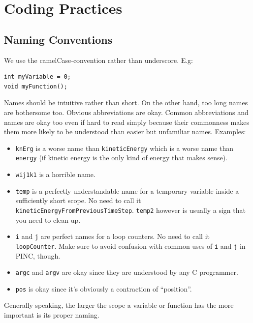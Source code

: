 \documentclass[10pt,a4paper]{article}
\begin{document}
\section{Coding Practices}

\subsection{Naming Conventions}
We use the camelCase-convention rather than underscore. E.g:
\begin{lstlisting}
int myVariable = 0;
void myFunction();
\end{lstlisting}
Names should be intuitive rather than short. On the other hand, too long names are bothersome too. Obvious abbreviations are okay. Common abbreviations and names are okay too even if hard to read simply because their commonness makes them more likely to be understood than easier but unfamiliar names. Examples:
	\begin{itemize}
		\item \lstinline$knErg$ is a worse name than \lstinline$kineticEnergy$ which is a worse name than \lstinline$energy$ (if kinetic energy is the only kind of energy that makes sense).
		\item \lstinline$wij1k1$ is a horrible name.
		\item \lstinline$temp$ is a perfectly understandable name for a temporary variable inside a sufficiently short scope. No need to call it \lstinline$kineticEnergyFromPreviousTimeStep$. \lstinline$temp2$ however is usually a sign that you need to clean up.
		\item \lstinline$i$ and \lstinline$j$ are perfect names for a loop counters. No need to call it \lstinline$loopCounter$. Make sure to avoid confusion with common uses of \lstinline$i$ and \lstinline$j$ in PINC, though.
		\item \lstinline$argc$ and \lstinline$argv$ are okay since they are understood by any C programmer.
		\item \lstinline$pos$ is okay since it's obviously a contraction of ``position''.
	\end{itemize}
Generally speaking, the larger the scope a variable or function has the more important is its proper naming.
\end{document}
